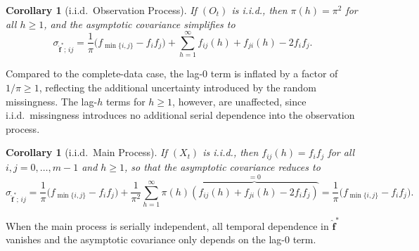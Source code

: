 ﻿\documentclass[12pt,a4paper]{scrreprt}
\newtheorem{corollary}[theorem]{Corollary}
\theoremstyle{definition}
\begin{document}
\begin{corollary}[i.i.d.\ Observation Process]\label{cor:iid_Obs}
If $(O_t)$ is i.i.d., then $\pi(h) = \pi^2$ for all $h \geq 1$,
and the asymptotic covariance simplifies to
\[
    \sigma_{\hat{\boldsymbol{f}}^*;\, ij}
    = \frac{1}{\pi}\bigl(f_{\min\{i,j\}} - f_if_j\bigr)
    + \sum_{h=1}^{\infty} f_{ij}(h) + f_{ji}(h) - 2f_if_j.
\]
\end{corollary}
\noindent Compared to the complete-data case, the lag-0 term is inflated by a factor of
$1/\pi \geq 1$, reflecting the additional uncertainty introduced by the random
missingness. The lag-$h$ terms for $h \geq 1$, however, are unaffected, since
i.i.d.\ missingness introduces no additional serial dependence into the observation
process.

\begin{corollary}[i.i.d.\ Main Process]\label{cor:iid_Main}
If $(X_t)$ is i.i.d., then $f_{ij}(h) = f_if_j$ for all
$i,j = 0,\ldots,m-1$ and $h \geq 1$, so that the asymptotic
covariance reduces to
\[
    \sigma_{\hat{\boldsymbol{f}}^*;\, ij}
    = \frac{1}{\pi}\bigl(f_{\min\{i,j\}} - f_i f_j\bigr)
    + \frac{1}{\pi^2}\sum_{h=1}^{\infty} \pi(h)
    \overbrace{(f_{ij}(h) + f_{ji}(h) - 2f_i f_j)}^{=0}
    = \frac{1}{\pi}\bigl(f_{\min\{i,j\}} - f_i f_j\bigr).
\]
\end{corollary}
\noindent When the main process is serially independent, all temporal dependence in
$\hat{\boldsymbol{f}}^*$ vanishes and the asymptotic covariance only depends on the lag-$0$ term. 
\end{document}

